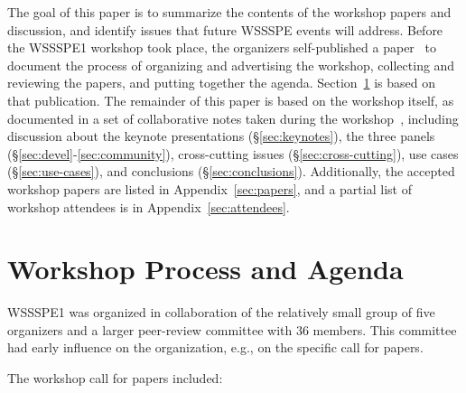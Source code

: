 \documentclass[11pt, oneside]{amsart}
\begin{document}
The goal of this paper is to summarize the contents of the workshop papers
and discussion, and identify issues that future WSSSPE events will address.
Before the WSSSPE1 workshop took place, the organizers self-published
a paper~\cite{WSSSPE1-pre-report} to document the process of
organizing and advertising the workshop, collecting and reviewing the
papers, and putting together the agenda. Section~\ref{sec:process} is
based on that publication. The remainder of this paper is based on the
workshop itself, as documented in a set of collaborative notes taken
during the workshop~\cite{WSSSPE1-google-notes}, including discussion
about the keynote presentations (\S\ref{sec:keynotes}), the three
panels (\S\ref{sec:devel}-\ref{sec:community}), 
cross-cutting issues (\S\ref{sec:cross-cutting}),
use cases (\S\ref{sec:use-cases}), and conclusions
(\S\ref{sec:conclusions}).  Additionally, the accepted workshop papers are listed in
Appendix~\ref{sec:papers}, and a partial list of workshop attendees is
in Appendix~\ref{sec:attendees}.


\section{Workshop Process and Agenda} \label{sec:process}

WSSSPE1 was organized in collaboration of the relatively small group
of five organizers and a larger peer-review committee with 36
members. This committee had early influence on the organization, e.g.,
on the specific call for papers.

The workshop call for papers included:
\end{document}
